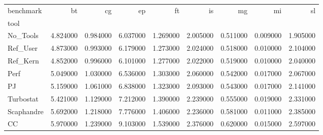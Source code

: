 \begin{tabular}{lrrrrrrrr}
\toprule
benchmark & bt & cg & ep & ft & is & mg & mi & sl \\
tool &  &  &  &  &  &  &  &  \\
\midrule
No_Tools & 4.824000 & 0.984000 & 6.037000 & 1.269000 & 2.005000 & 0.511000 & 0.009000 & 1.905000 \\
Ref_User & 4.873000 & 0.993000 & 6.179000 & 1.273000 & 2.024000 & 0.518000 & 0.010000 & 2.104000 \\
Ref_Kern & 4.852000 & 0.996000 & 6.101000 & 1.277000 & 2.022000 & 0.519000 & 0.010000 & 2.040000 \\
Perf & 5.049000 & 1.030000 & 6.536000 & 1.303000 & 2.060000 & 0.542000 & 0.017000 & 2.067000 \\
PJ & 5.159000 & 1.061000 & 6.838000 & 1.323000 & 2.093000 & 0.543000 & 0.017000 & 2.141000 \\
Turbostat & 5.421000 & 1.129000 & 7.212000 & 1.390000 & 2.239000 & 0.555000 & 0.019000 & 2.331000 \\
Scaphandre & 5.692000 & 1.218000 & 7.776000 & 1.406000 & 2.236000 & 0.581000 & 0.011000 & 2.385000 \\
CC & 5.970000 & 1.239000 & 9.103000 & 1.539000 & 2.376000 & 0.620000 & 0.015000 & 2.597000 \\
\bottomrule
\end{tabular}
